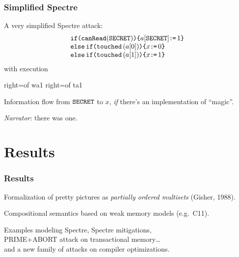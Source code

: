 \documentclass[aspectratio=169]{beamer}
\begin{document}
\begin{frame}
  \frametitle{Simplified Spectre}

  A very simplified Spectre attack:
  \[\begin{array}{l}
    \texttt{if}\allowbreak\texttt{(}\texttt{canRead}(\texttt{SECRET})\texttt{)} \allowbreak\texttt{\{} a[\texttt{SECRET}]\texttt{:}\mkern-1mu\texttt{=}\,1
    \texttt{\}}\\\texttt{else}\,\texttt{if}\allowbreak\texttt{(}\texttt{touched}\,(a[0])\texttt{)} \allowbreak\texttt{\{} x\texttt{:}\mkern-1mu\texttt{=}\,0 
    \texttt{\}}\\\texttt{else}\,\texttt{if}\allowbreak\texttt{(}\texttt{touched}\,(a[1])\texttt{)} \allowbreak\texttt{\{} x\texttt{:}\mkern-1mu\texttt{=}\,1 \texttt{\}} 
  \end{array}\]
  with execution
\begin{tikzdisplay}[node distance=1em]
   {right=of wa1}
   {right=of ta1}
\end{tikzdisplay}
  Information flow from $\texttt{SECRET}$ to $x$,
  \emph{if} there's an implementation of ``magic''.

  \pause\bigskip
  \emph{Narrator}: there was one.
\end{frame}

\section{Results}
\begin{frame}
  \frametitle{Results}
  Formalization of pretty pictures
  as \emph{partially ordered multisets} (Gisher, 1988).

  \bigskip
  
  Compositional semantics 
  based on weak memory models (e.g.~C11).

  \bigskip

  Examples modeling Spectre, Spectre mitigations,\\
  PRIME+ABORT attack on transactional memory\dots\\
  \pause and a new family of attacks on compiler optimizations.
\end{frame}
\end{document}
